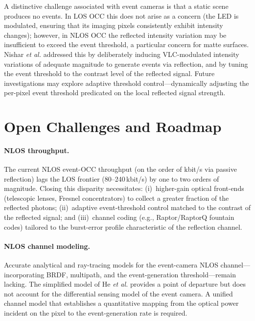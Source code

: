 \documentclass[10pt,a4paper]{article}
\begin{document}
A distinctive challenge associated with event cameras is that a static
scene produces no events. In LOS OCC this does not arise as a concern
(the LED is modulated, ensuring that its imaging pixels consistently
exhibit intensity changes); however, in NLOS OCC the reflected intensity
variation may be insufficient to exceed the event threshold, a
particular concern for matte surfaces. Nishar \emph{et al.}
\cite{nishar2025nlosneuromorphic} addressed this by deliberately
inducing VLC-modulated intensity variations of adequate magnitude to
generate events via reflection, and by tuning the event threshold to the
contrast level of the reflected signal. Future investigations may
explore adaptive threshold control---dynamically adjusting the per-pixel
event threshold predicated on the local reflected signal strength.

\section{Open Challenges and Roadmap}
\label{sec:roadmap}

\paragraph{NLOS throughput.}
The current NLOS event-OCC throughput (on the order of kbit/s via
passive reflection) lags the LOS frontier (80--240\,kbit/s) by one to
two orders of magnitude. Closing this disparity necessitates:
(i)~higher-gain optical front-ends (telescopic lenses, Fresnel
concentrators) to collect a greater fraction of the reflected photons;
(ii)~adaptive event-threshold control matched to the contrast of the
reflected signal; and (iii)~channel coding (e.g., Raptor/RaptorQ
fountain codes) tailored to the burst-error profile characteristic of
the reflection channel.

\paragraph{NLOS channel modeling.}
Accurate analytical and ray-tracing models for the event-camera NLOS
channel---incorporating BRDF, multipath, and the event-generation
threshold---remain lacking. The simplified model of He \emph{et al.}
\cite{he2023nlosmodel} provides a point of departure but does not
account for the differential sensing model of the event camera. A
unified channel model that establishes a quantitative mapping from the
optical power incident on the pixel to the event-generation rate is
required.
\end{document}
